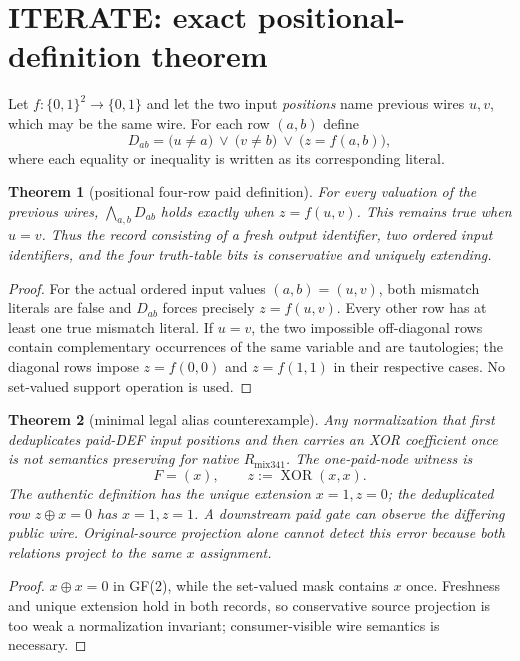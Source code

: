 \documentclass[11pt]{article}
\newtheorem{theorem}{Theorem}
\begin{document}
\section{ITERATE: exact positional-definition theorem}

Let $f:\{0,1\}^2\to\{0,1\}$ and let the two input \emph{positions} name previous wires $u,v$, which may be the same wire.  For each row $(a,b)$ define
\[
 D_{ab}=\bigl(u\ne a\bigr)\ \vee\ \bigl(v\ne b\bigr)\ \vee\ \bigl(z=f(a,b)\bigr),
\]
where each equality or inequality is written as its corresponding literal.

\begin{theorem}[positional four-row paid definition]\label{thm:fourrow}
For every valuation of the previous wires, $\bigwedge_{a,b}D_{ab}$ holds exactly when $z=f(u,v)$.  This remains true when $u=v$.  Thus the record consisting of a fresh output identifier, two ordered input identifiers, and the four truth-table bits is conservative and uniquely extending.
\end{theorem}
\begin{proof}
For the actual ordered input values $(a,b)=(u,v)$, both mismatch literals are false and $D_{ab}$ forces precisely $z=f(u,v)$.  Every other row has at least one true mismatch literal.  If $u=v$, the two impossible off-diagonal rows contain complementary occurrences of the same variable and are tautologies; the diagonal rows impose $z=f(0,0)$ and $z=f(1,1)$ in their respective cases.  No set-valued support operation is used.
\end{proof}

\begin{theorem}[minimal legal alias counterexample]\label{thm:alias}
Any normalization that first deduplicates paid-DEF input positions and then carries an XOR coefficient once is not semantics preserving for native $R_{\mathrm{mix341}}$.  The one-paid-node witness is
\[
  F=(x),\qquad z:=\operatorname{XOR}(x,x).
\]
The authentic definition has the unique extension $x=1,z=0$; the deduplicated row $z\oplus x=0$ has $x=1,z=1$.  A downstream paid gate can observe the differing public wire.  Original-source projection alone cannot detect this error because both relations project to the same $x$ assignment.
\end{theorem}
\begin{proof}
$x\oplus x=0$ in GF(2), while the set-valued mask contains $x$ once.  Freshness and unique extension hold in both records, so conservative source projection is too weak a normalization invariant; consumer-visible wire semantics is necessary.
\end{proof}
\end{document}
